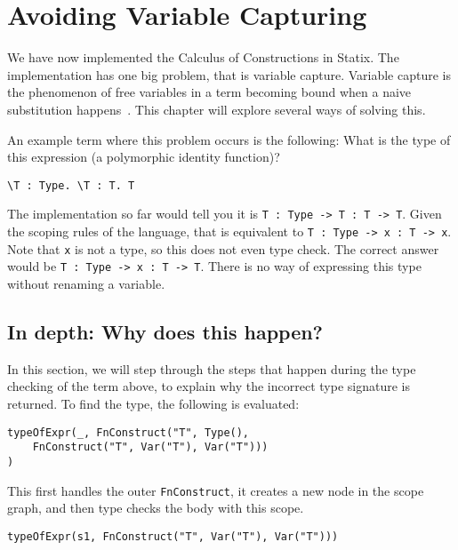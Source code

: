 
\chapter{\label{chap:namecolls}Avoiding Variable Capturing}

We have now implemented the Calculus of Constructions in Statix. The implementation has one big problem, that is variable capture. Variable capture is the phenomenon of free variables in a term becoming bound when a naive substitution happens~\cite{tapl}. This chapter will explore several ways of solving this. 

An example term where this problem occurs is the following: What is the type of this expression (a polymorphic identity function)?
\begin{lstlisting}
\T : Type. \T : T. T
\end{lstlisting}
The implementation so far would tell you it is \verb|T : Type -> T : T -> T|. Given the scoping rules of the language, that is equivalent to \verb|T : Type -> x : T -> x|. Note that \verb|x| is not a type, so this does not even type check. The correct answer would be \verb|T : Type -> x : T -> T|. There is no way of expressing this type without renaming a variable.

\section{In depth: Why does this happen?}

In this section, we will step through the steps that happen during the type checking of the term above, to explain why the incorrect type signature is returned. To find the type, the following is evaluated:

\begin{lstlisting}
typeOfExpr(_, FnConstruct("T", Type(), 
    FnConstruct("T", Var("T"), Var("T")))
)
\end{lstlisting}

\noindent
This first handles the outer \verb|FnConstruct|, it creates a new node in the scope graph, and then type checks the body with this scope.

\begin{lstlisting}
typeOfExpr(s1, FnConstruct("T", Var("T"), Var("T")))
\end{lstlisting}

